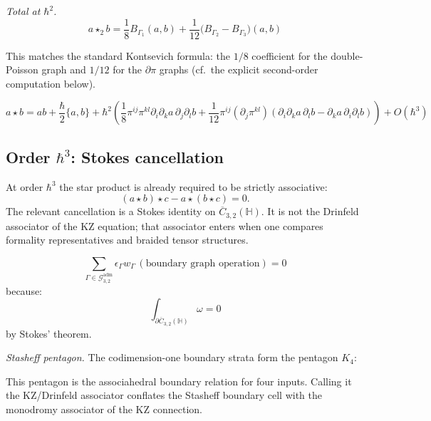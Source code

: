 \emph{Total at $\hbar^2$.}
\[a \star_2 b = \frac{1}{8}B_{\Gamma_1}(a,b) + \frac{1}{12}\bigl(B_{\Gamma_2} - B_{\Gamma_3}\bigr)(a,b)\]

This matches the standard Kontsevich formula: the $1/8$ coefficient for the double-Poisson graph and $1/12$ for the $\partial\pi$ graphs (cf.\ the explicit second-order computation below).

\begin{theorem}
\label{thm:kontsevich-explicit-formula}
\[a \star b = ab + \frac{\hbar}{2}\{a,b\} + \hbar^2\!\left(\frac{1}{8}\pi^{ij}\pi^{kl}\partial_i\partial_k a\,\partial_j\partial_l b + \frac{1}{12}\pi^{ij}(\partial_j\pi^{kl})(\partial_i\partial_k a\,\partial_l b - \partial_k a\,\partial_i\partial_l b)\right) + O(\hbar^3)\]
\end{theorem}

\subsection{\texorpdfstring{Order $\hbar^3$: Stokes cancellation}{Order 3: Stokes cancellation}}

At order $\hbar^3$ the star product is already required to be
strictly associative:
\[
(a\star b)\star c-a\star(b\star c)=0.
\]
The relevant cancellation is a Stokes identity on
\(\overline C_{3,2}(\mathbb H)\). It is not the Drinfeld associator of
the KZ equation; that associator enters when one compares formality
representatives and braided tensor structures.

\begin{theorem}
\label{thm:stokes-associativity}
\[
\sum_{\Gamma\in\mathcal G_{3,2}^{\mathrm{adm}}}
\epsilon_\Gamma w_\Gamma\,
(\text{boundary graph operation})=0
\]
because:
\[\int_{\partial \overline{C}_{3,2}(\mathbb H)} \omega = 0\]
by Stokes' theorem.
\end{theorem}

\emph{Stasheff pentagon.}
The codimension-one boundary strata form the pentagon \(K_4\):
\begin{center}
\end{center}
This pentagon is the associahedral boundary relation for four inputs.
Calling it the KZ/Drinfeld associator conflates the Stasheff
boundary cell with the monodromy associator of the KZ connection.

